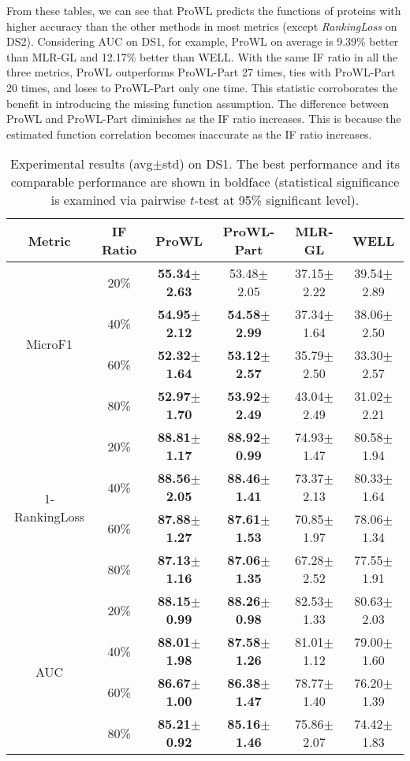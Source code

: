 \documentclass{llncs} %
\begin{document}
From these tables, we can see that ProWL predicts the functions of proteins with
higher accuracy than the other methods in most metrics (except \emph{RankingLoss} on DS2). Considering AUC
on DS1, for example, ProWL on average is 9.39\% better than MLR-GL and 12.17\% better than WELL. With the same IF ratio in all the three metrics, ProWL outperforms ProWL-Part 27 times, ties with ProWL-Part 20 times, and loses to ProWL-Part only one time. This statistic corroborates
the benefit in introducing the missing function assumption. The difference between ProWL and ProWL-Part diminishes as the IF ratio increases. This
is because the estimated function correlation becomes inaccurate as the IF ratio increases.
\begin{table*}[h!]
\scriptsize
\caption{Experimental results (avg$\pm$std) on DS1. The best performance and its comparable performance are shown in boldface (statistical significance is examined via pairwise $t$-test at 95\% significant level).}
\centering
\begin{tabular}{|c| c| c| c| c| c|}
\hline
Metric &IF Ratio &ProWL &ProWL-Part &MLR-GL &WELL\\
\hline
\multirow{4}{*}{MicroF1}
& 20\% &\bf 55.34$\pm$2.63 &53.48$\pm$2.05 &37.15$\pm$2.22 &39.54$\pm$2.89\\
& 40\% &\bf 54.95$\pm$2.12 &\bf 54.58$\pm$2.99 &37.34$\pm$1.64 &38.06$\pm$2.50\\
& 60\% &\bf 52.32$\pm$1.64 &\bf 53.12$\pm$2.57 &35.79$\pm$2.50 &33.30$\pm$2.57\\
& 80\% &\bf 52.97$\pm$1.70 &\bf 53.92$\pm$2.49 &43.04$\pm$2.49 &31.02$\pm$2.21\\
\hline
\multirow{4}{*}{1-RankingLoss}
& 20\% &\bf 88.81$\pm$1.17 &\bf 88.92$\pm$0.99 &74.93$\pm$1.47 &80.58$\pm$1.94\\
& 40\% &\bf 88.56$\pm$2.05 &\bf 88.46$\pm$1.41 &73.37$\pm$2.13 &80.33$\pm$1.64\\
& 60\% &\bf 87.88$\pm$1.27 &\bf 87.61$\pm$1.53 &70.85$\pm$1.97 &78.06$\pm$1.34\\
& 80\% &\bf 87.13$\pm$1.16 &\bf 87.06$\pm$1.35 &67.28$\pm$2.52 &77.55$\pm$1.91\\
\hline
\multirow{4}{*}{AUC}
& 20\% &\bf 88.15$\pm$0.99 &\bf 88.26$\pm$0.98 &82.53$\pm$1.33 &80.63$\pm$2.03\\
& 40\% &\bf 88.01$\pm$1.98 &\bf 87.58$\pm$1.26 &81.01$\pm$1.12 &79.00$\pm$1.60\\
& 60\% &\bf 86.67$\pm$1.00 &\bf 86.38$\pm$1.47 &78.77$\pm$1.40 &76.20$\pm$1.39\\
& 80\% &\bf 85.21$\pm$0.92 &\bf 85.16$\pm$1.46 &75.86$\pm$2.07 &74.42$\pm$1.83\\
\hline
\end{tabular}
\label{Table2}
\end{table*}
\end{document}
